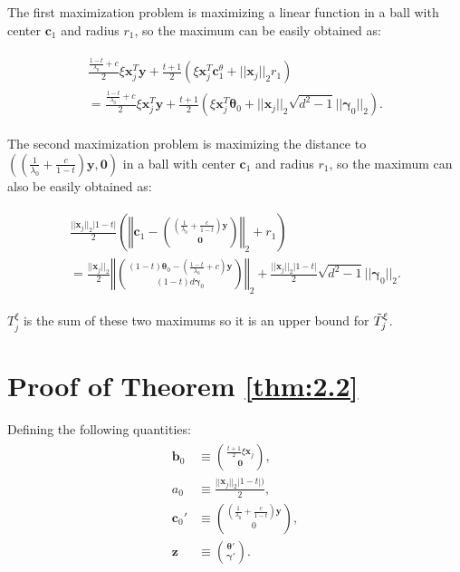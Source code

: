 The first maximization problem is maximizing a linear function in a ball with center $\boldsymbol c_1$ and radius $r_1$, so the maximum can be easily obtained as:

\begin{gather}
    \begin{aligned}
        \frac{\frac{1-t}{\lambda_0}+c}{2}\xi\boldsymbol x_j^T \boldsymbol y+\frac{t+1}{2}\left(\xi \boldsymbol x_j^T \boldsymbol c_1^\theta+||\boldsymbol x_j||_2r_1\right)\\
        =\frac{\frac{1-t}{\lambda_0}+c}{2}\xi\boldsymbol x_j^T \boldsymbol y+\frac{t+1}{2}\left(\xi \boldsymbol x_j^T \boldsymbol \theta_{0}+||\boldsymbol x_j||_2\sqrt{d^2-1}||\boldsymbol\gamma_{0}||_2\right).
    \end{aligned}
\end{gather}

The second maximization problem is maximizing the distance to $\left((\frac{1}{\lambda_0}+\frac{c}{1-t})\boldsymbol y,\boldsymbol 0\right)$ in a ball with center $\boldsymbol c_1$ and radius $r_1$, so the maximum can also be easily obtained as:

\begin{gather}
    \begin{aligned}
        \frac{||\boldsymbol x_j||_2|1-t|}{2}\left(\left\Vert\boldsymbol c_1-\binom{(\frac{1}{\lambda_0}+\frac{c}{1-t})\boldsymbol y}{\boldsymbol 0}\right\Vert_2+r_1\right)\\
        =\frac{||\boldsymbol x_j||_2}{2}\left\Vert\binom{(1-t)\boldsymbol\theta_{0}-\left(\frac{1-t}{\lambda_0}+c\right)\boldsymbol y}{(1-t)d\boldsymbol\gamma_{0}}\right\Vert_2+\frac{||\boldsymbol x_j||_2|1-t|}{2}\sqrt{d^2-1}||\boldsymbol\gamma_0||_2.
    \end{aligned}
\end{gather}

$T^\xi_j$ is the sum of these two maximums so it is an upper bound for $\Tilde{T}^\xi_j$.

\iffalse
\section{Proof of Theorem \ref{thm:2.2}}

Defining the following quantities:
\begin{gather}
    \begin{aligned}
        \boldsymbol b_0&\equiv\binom{\frac{t+1}{2}\xi \boldsymbol x_j}{\boldsymbol 0},\\
        a_0&\equiv\frac{||\boldsymbol x_j||_2|1-t|)}{2},\\
        \boldsymbol c_0'&\equiv\binom{\left(\frac{1}{\lambda_0}+\frac{c}{1-t}\right)\boldsymbol y}{0},\\
        \boldsymbol z &\equiv \binom{\boldsymbol\theta'}{\boldsymbol\gamma'}.
    \end{aligned}
\end{gather}

